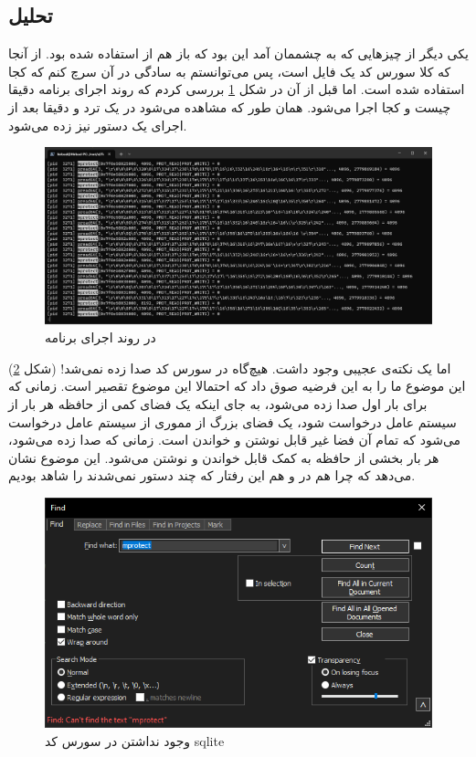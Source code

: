 \subsection{تحلیل}
یکی دیگر از چیز‌هایی که به چشممان آمد این بود که باز هم از
استفاده شده بود. از آنجا که کلا سورس کد
یک فایل است، پس می‌توانستم به سادگی در آن سرچ کنم که کجا
استفاده شده است. اما قبل از آن در شکل
\ref{fig:sqlite3:results:mprotect}
بررسی کردم که روند اجرای برنامه دقیقا چیست و کجا
اجرا می‌شود. همان طور که مشاهده می‌شود در یک ترد و دقیقا بعد از اجرای
 یک دستور 
نیز زده می‌شود.
\begin{figure}[H]
    \centering
    \includegraphics[scale=0.4]{pictures/sqlite3/results/mprotect.png}
    \caption{ در روند اجرای برنامه}
    \label{fig:sqlite3:results:mprotect}
\end{figure}
اما یک نکته‌ی عجیبی وجود داشت. هیچ‌گاه
در سورس کد
صدا زده نمی‌شد!
(شکل \ref{fig:sqlite3:results:mprotect2})
این موضوع ما را به این فرضیه صوق داد که احتمالا این موضوع تقصیر
است. زمانی که برای بار اول
صدا زده می‌شود، به جای اینکه یک فضای کمی از حافظه هر بار از سیستم عامل درخواست شود، یک فضای بزرگ
از مموری از سیستم عامل درخواست می‌شود که تمام آن فضا غیر قابل نوشتن و خواندن است.
زمانی که
صدا زده می‌شود، هر بار بخشی از حافظه به کمک
قابل خواندن و نوشتن می‌شود. این موضوع نشان می‌دهد که چرا هم در
 و هم 
این رفتار که چند دستور
 
نمی‌شدند را شاهد بودیم.
\begin{figure}[H]
    \centering
    \includegraphics[scale=0.6]{pictures/sqlite3/results/mprotect2.png}
    \caption{وجود نداشتن  در سورس کد sqlite}
    \label{fig:sqlite3:results:mprotect2}
\end{figure}
